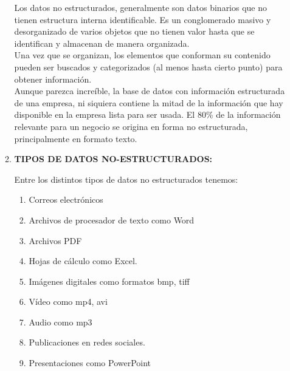 \documentclass[12pt,a4paper,oneside]{book}
\begin{document}
\begin{enumerate}
\begin{enumerate}
					Los datos no estructurados, generalmente son datos binarios que no tienen estructura interna identificable. Es un conglomerado masivo y desorganizado de varios objetos que no tienen valor hasta que se identifican y almacenan de manera organizada.\\
					
					Una vez que se organizan, los elementos que conforman su contenido pueden ser buscados y categorizados (al menos hasta cierto punto) para obtener información.\\
					
					Aunque parezca increíble, la base de datos con información estructurada de una empresa, ni siquiera contiene la mitad de la información que hay disponible en la empresa lista para ser usada. El 80\% de la información relevante para un negocio se origina en forma no estructurada, principalmente en formato texto.\\
					
					
					\item \textbf{TIPOS DE DATOS NO-ESTRUCTURADOS:}
					
					Entre los distintos tipos de datos no estructurados tenemos:
					
					\begin{enumerate}
						
						\item Correos electrónicos
						
						\item Archivos de procesador de texto como Word
						
						\item Archivos PDF
						
						\item Hojas de cálculo como Excel.
						
						\item Imágenes digitales como 
						formatos bmp, tiff
						
						\item Vídeo como mp4, avi
						
						\item Audio como mp3
						
						\item Publicaciones en redes sociales.
						
						\item Presentaciones como PowerPoint
						
						
					\end{enumerate}
					

\end{enumerate}
\end{enumerate}
\end{document}
